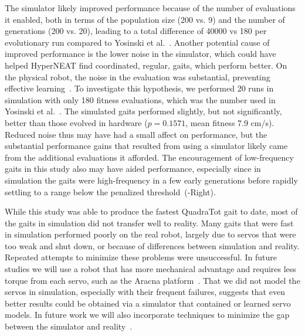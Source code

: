 The simulator likely improved performance because of the number of evaluations it enabled, both in terms of the population size (200 vs. 9) and the number of generations (200 vs. 20), leading
to a total difference of 40000 vs 180 per evolutionary run compared to Yosinski et al.~\cite{yos:clune}. Another
potential cause of improved performance is the lower noise in the simulator, which could have helped HyperNEAT find coordinated, regular, gaits, which perform better. On the physical robot, the noise in the evaluation was
substantial, preventing effective learning~\cite{yos:clune}. 
To investigate this hypothesis, we performed 20 runs in simulation with only 180 fitness evaluations, which was the number used in Yosinski et al.~\cite{yos:clune}. The simulated gaits performed
slightly, but not significantly, better than those evolved in hardware ($p = 0.1571$, mean fitness 7.9 cm/s).
Reduced noise thus may have had a small affect on performance, but the substantial performance gains that resulted from using a simulator likely came from the additional evaluations it afforded.
The encouragement of low-frequency gaits in this study
also may have aided performance, especially since in simulation the gaits were
high-frequency in a few early generations before rapidly settling to a
 range below the penalized threshold~(-Right).



While this study was able to produce the fastest QuadraTot gait to
date, most of the gaits in simulation did not transfer well to
reality. Many gaits that were fast in simulation performed
poorly on the real robot, largely due to servos that were too weak and
shut down, or because of differences between simulation and
reality. Repeated attempts to minimize these problems were
unsuccessful. 
In future studies we will use a
robot that has more mechanical advantage and requires less torque from
each servo, such as the Aracna platform~\cite{lohmann2012aracna}.
That we did not model the servos in simulation, especially with their frequent failures, suggests that even better results could be obtained via a simulator that contained or learned servo models. In future work we will also incorporate techniques to minimize the gap between the simulator and reality~\cite{koos2010crossing,bongard,zagal}.

